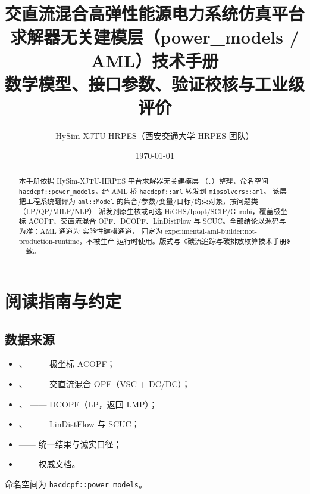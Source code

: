 \documentclass[UTF8,fontset=fandol,a4paper,11pt]{ctexart}
\title{\textbf{交直流混合高弹性能源电力系统仿真平台}\\[0.5em]
       {\Large 求解器无关建模层（power\_models / AML）技术手册}\\[0.3em]
       {\large 数学模型、接口参数、验证校核与工业级评价}}
\author{HySim-XJTU-HRPES（西安交通大学 HRPES 团队）}
\date{\today}
\begin{document}
\maketitle
\begin{abstract}
\noindent 本手册依据 HySim-XJTU-HRPES 平台求解器无关建模层
（、）整理，命名空间
\texttt{hacdcpf::power\_models}，经 AML 桥 \texttt{hacdcpf::aml} 转发到 \texttt{mipsolvers::aml}。
该层把工程系统翻译为 \texttt{aml::Model} 的集合/参数/变量/目标/约束对象，按问题类（LP/QP/MILP/NLP）
派发到原生核或可选 HiGHS/Ipopt/SCIP/Gurobi，覆盖极坐标 ACOPF、交直流混合 OPF、DCOPF、LinDistFlow
与 SCUC。全部结论以源码与  为准：AML 通道为
实验性建模通道， 固定为 experimental-aml-builder:not-production-runtime，不被生产
运行时使用。版式与《碳流追踪与碳排放核算技术手册》一致。
\end{abstract}

\tableofcontents
\newpage

\section{阅读指南与约定}
\subsection{数据来源}
\begin{itemize}
  \item {}、
         —— 极坐标 ACOPF；
  \item {}、
         —— 交直流混合 OPF（VSC + DC/DC）；
  \item {}、
         —— DCOPF（LP，返回 LMP）；
  \item {}、
         —— LinDistFlow 与 SCUC；
  \item {} —— 统一结果与诚实口径；
  \item {} —— 权威文档。
\end{itemize}
命名空间为 \texttt{hacdcpf::power\_models}。
\end{document}
